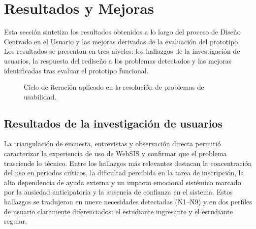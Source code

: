 \section{Resultados y Mejoras}

Esta sección sintetiza los resultados obtenidos a lo largo del proceso de Diseño Centrado en el Usuario y las mejoras derivadas de la evaluación del prototipo. Los resultados se presentan en tres niveles: los hallazgos de la investigación de usuarios, la respuesta del rediseño a los problemas detectados y las mejoras identificadas tras evaluar el prototipo funcional.

\vspace{0.5cm}
\begin{figure}[H]
\centering
{}
\caption{Ciclo de iteración aplicado en la resolución de problemas de usabilidad.}
\label{fig:ciclo-iteracion}
\end{figure}

\subsection{Resultados de la investigación de usuarios}

La triangulación de encuesta, entrevistas y observación directa permitió caracterizar la experiencia de uso de WebSIS y confirmar que el problema trasciende lo técnico. Entre los hallazgos más relevantes destacan la concentración del uso en periodos críticos, la dificultad percibida en la tarea de inscripción, la alta dependencia de ayuda externa y un impacto emocional sistémico marcado por la ansiedad anticipatoria y la ausencia de confianza en el sistema. Estos hallazgos se tradujeron en nueve necesidades detectadas (N1--N9) y en dos perfiles de usuario claramente diferenciados: el estudiante ingresante y el estudiante regular.

